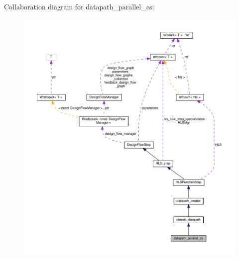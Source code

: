 Collaboration diagram for datapath\+\_\+parallel\+\_\+cs\+:
\nopagebreak
\begin{figure}[H]
\begin{center}
\leavevmode
\includegraphics[width=350pt]{d9/dbe/classdatapath__parallel__cs__coll__graph}
\end{center}
\end{figure}
